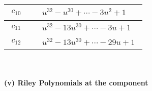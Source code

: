 \documentclass[1p]{elsarticle_modified}
\theoremstyle{definition}
\begin{document}
\begin{tabular}{m{50pt}|m{274pt}}
\hline $$\begin{aligned}c_{10}\end{aligned}$$&$\begin{aligned}
&u^{32}- u^{30}+\cdots-3 u^2+1
\end{aligned}$\\
\hline $$\begin{aligned}c_{11}\end{aligned}$$&$\begin{aligned}
&u^{32}-13 u^{30}+\cdots-3 u+1
\end{aligned}$\\
\hline $$\begin{aligned}c_{12}\end{aligned}$$&$\begin{aligned}
&u^{32}-13 u^{30}+\cdots-29 u+1
\end{aligned}$\\
\hline
\end{tabular}\\~\\
\newpage\renewcommand{\arraystretch}{1}
\flushleft \textbf{(v) Riley Polynomials at the component}\newline \\
\end{document}
